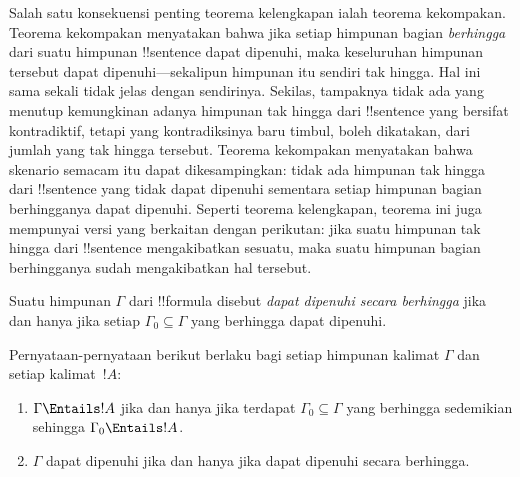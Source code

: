 \documentclass[../../../include/open-logic-section]{subfiles}
\begin{document}
      {}
      {}


Salah satu konsekuensi penting teorema kelengkapan ialah teorema
kekompakan. Teorema kekompakan menyatakan bahwa jika setiap himpunan
bagian \emph{berhingga} dari suatu himpunan !!{sentence} dapat dipenuhi,
maka keseluruhan himpunan tersebut dapat dipenuhi---sekalipun himpunan
itu sendiri tak hingga. Hal ini sama sekali tidak jelas dengan
sendirinya. Sekilas, tampaknya tidak ada yang menutup kemungkinan adanya
himpunan tak hingga dari !!{sentence} yang bersifat kontradiktif, tetapi
yang kontradiksinya baru timbul, boleh dikatakan, dari jumlah yang tak
hingga tersebut. Teorema kekompakan menyatakan bahwa skenario semacam
itu dapat dikesampingkan: tidak ada himpunan tak hingga dari !!{sentence}
yang tidak dapat dipenuhi sementara setiap himpunan bagian berhingganya
dapat dipenuhi. Seperti teorema kelengkapan, teorema ini juga mempunyai
versi yang berkaitan dengan perikutan: jika suatu himpunan tak hingga
dari !!{sentence} mengakibatkan sesuatu, maka suatu himpunan bagian
berhingganya sudah mengakibatkan hal tersebut.

\begin{defn}
  Suatu himpunan $\Gamma$ dari !!{formula} disebut \emph{dapat dipenuhi
  secara berhingga} jika dan hanya jika setiap $\Gamma_0 \subseteq
  \Gamma$ yang berhingga dapat dipenuhi.
\end{defn}

\begin{thm}
Pernyataan-pernyataan berikut berlaku bagi setiap himpunan kalimat
$\Gamma$ dan setiap kalimat~$!A$:
\begin{enumerate}
  \item $\Gamma \Entails !A$ jika dan hanya jika terdapat $\Gamma_0
    \subseteq \Gamma$ yang berhingga sedemikian sehingga
    $\Gamma_0 \Entails !A$.
  \item $\Gamma$ dapat dipenuhi jika dan hanya jika dapat dipenuhi
    secara berhingga.
\end{enumerate}
\end{thm}
\end{document}

